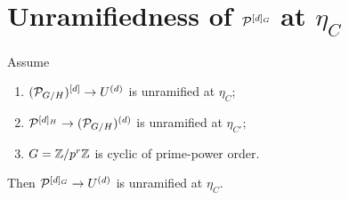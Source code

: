 \documentclass[11pt]{article}
\begin{document}
\section{Unramifiedness of \texorpdfstring{$\mathcal{P}^{[d]_G}$}{P\^{}[d]\_G} at \texorpdfstring{$\eta_C$}{eta\_C}}\label{sec:main}

\begin{theorem}\label{thm:main}
Assume
\begin{enumerate}
  \item[\textnormal{(H1)}] $(\mathcal{P}_{G/H})^{[d]} \to U^{(d)}$ is unramified at
        $\eta_C$;
  \item[\textnormal{(H2)}] $\mathcal{P}^{[d]_H} \to (\mathcal{P}_{G/H})^{(d)}$ is unramified at
        $\eta_{C'}$;
  \item[\textnormal{(H3)}] $G = \mathbb{Z}/p^r\mathbb{Z}$ is cyclic of prime-power order.
\end{enumerate}
Then $\mathcal{P}^{[d]_G} \to U^{(d)}$ is unramified at $\eta_C$.
\end{theorem}
\end{document}
